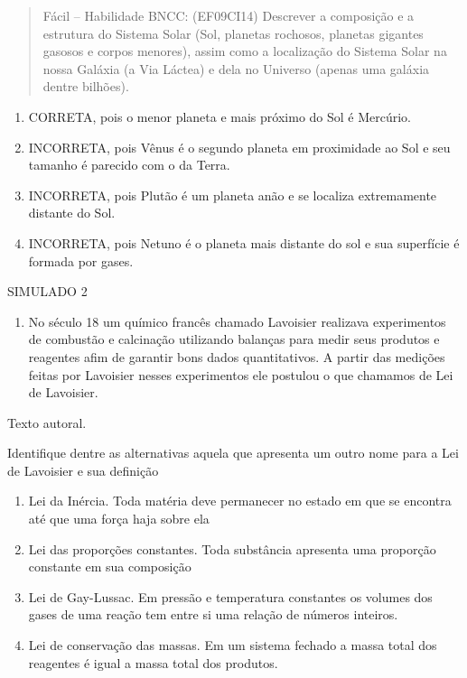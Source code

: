 \begin{quote}
Fácil -- Habilidade BNCC: (EF09CI14) Descrever a composição e a
estrutura do Sistema Solar (Sol, planetas rochosos, planetas gigantes
gasosos e corpos menores), assim como a localização do Sistema Solar na
nossa Galáxia (a Via Láctea) e dela no Universo (apenas uma galáxia
dentre bilhões).
\end{quote}

\begin{enumerate}
\def\labelenumi{(\Alph{enumi})}
\item
  CORRETA, pois o menor planeta e mais próximo do Sol é Mercúrio.
\item
  INCORRETA, pois Vênus é o segundo planeta em proximidade ao Sol e seu
  tamanho é parecido com o da Terra.
\item
  INCORRETA, pois Plutão é um planeta anão e se localiza extremamente
  distante do Sol.
\item
  INCORRETA, pois Netuno é o planeta mais distante do sol e sua
  superfície é formada por gases.
\end{enumerate}

SIMULADO 2

\begin{enumerate}
\def\labelenumi{\arabic{enumi})}
\item
  No século 18 um químico francês chamado Lavoisier realizava
  experimentos de combustão e calcinação utilizando balanças para medir
  seus produtos e reagentes afim de garantir bons dados quantitativos. A
  partir das medições feitas por Lavoisier nesses experimentos ele
  postulou o que chamamos de Lei de Lavoisier.
\end{enumerate}

Texto autoral.

Identifique dentre as alternativas aquela que apresenta um outro nome
para a Lei de Lavoisier e sua definição

\begin{enumerate}
\def\labelenumi{(\Alph{enumi})}
\item
  Lei da Inércia. Toda matéria deve permanecer no estado em que se
  encontra até que uma força haja sobre ela
\item
  Lei das proporções constantes. Toda substância apresenta uma proporção
  constante em sua composição
\item
  Lei de Gay-Lussac. Em pressão e temperatura constantes os volumes dos
  gases de uma reação tem entre si uma relação de números inteiros.
\item
  Lei de conservação das massas. Em um sistema fechado a massa total dos
  reagentes é igual a massa total dos produtos.
\end{enumerate}

